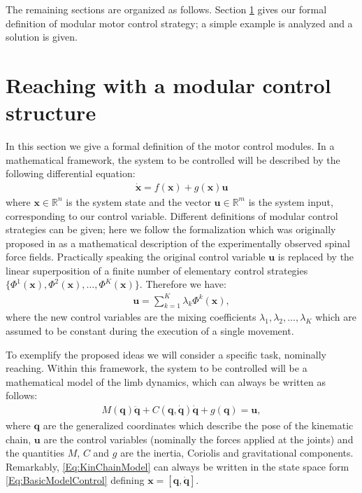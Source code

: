 \documentclass{svmult}
\begin{document}
The remaining sections are organized as follows. Section
\ref{Sec:SimpleReach} gives our formal definition of 
modular motor control strategy; a simple example is
analyzed and a solution is given.

\section{Reaching with a modular control structure} \label{Sec:SimpleReach}

In this section we give a formal definition of the motor
control modules. In a mathematical framework, the system
to be controlled will be described by the following differential 
equation:
\begin{eqnarray} \label{Eq:NonLinMod}
\mathbf {\dot x} = f (\mathbf x) + g(\mathbf x) \mathbf u
\end{eqnarray}
where $\mathbf x \in \mathbb R^n$ is the system state and 
the vector $\mathbf u  \in \mathbb R^m$ is the system input,
corresponding to our control variable. Different definitions
of modular control strategies can be given; here we follow the 
formalization which was originally proposed in \cite{BizziMussa-Ivaldi}
as a mathematical description of the experimentally observed
spinal force fields. Practically speaking the original control
variable $\mathbf u$ is replaced by the linear superposition
of a finite number of elementary control strategies 
$\{ \Phi^1(\mathbf x), \Phi^2(\mathbf x), \dots, \Phi^K(\mathbf x)\}$. Therefore we have:
\begin{eqnarray} \label{Eq:BasicModelControl}
\mathbf u = \sum_{k=1}^K \lambda_k \Phi^k(\mathbf x),
\end{eqnarray}
where the new control variables are the mixing coefficients 
$\lambda_1, \lambda_2, \dots, \lambda_K$ which are assumed to be 
constant during the execution of a single movement. 

To exemplify the proposed ideas we will consider a specific task, 
nominally reaching. Within this framework, the system to be controlled
will be a mathematical model of the limb dynamics, which can always
be written as follows:
\begin{eqnarray} \label{Eq:KinChainModel}
M(\mathbf{q}) \ddot{\mathbf{q}} +
C(\mathbf{q},\dot{\mathbf{q}})\dot{\mathbf{q}} + g(\mathbf{q}) =
\mathbf{u},
\end{eqnarray}
where $\mathbf{q}$ are the generalized coordinates which describe
the pose of the kinematic chain, $\mathbf{u}$ are the control
variables (nominally the forces applied at the joints) and the
quantities $M$, $C$ and  $g$ are the inertia, Coriolis and
gravitational components. Remarkably, \eqref{Eq:KinChainModel}
can always be written in the state space form 
\eqref{Eq:BasicModelControl} defining $\mathbf x = [\mathbf q, 
\dot{\mathbf q}]$.
 
\end{document}
